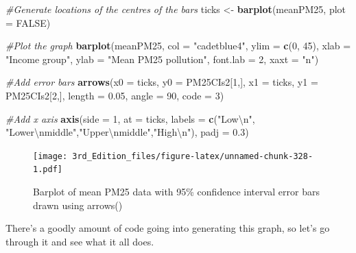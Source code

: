 \documentclass[
]{book}
\newenvironment{Shaded}{\begin{snugshade}}{\end{snugshade}}
\newcommand{\CharTok}[1]{\textcolor[rgb]{0.31,0.60,0.02}{#1}}
\newcommand{\CommentTok}[1]{\textcolor[rgb]{0.56,0.35,0.01}{\textit{#1}}}
\newcommand{\DataTypeTok}[1]{\textcolor[rgb]{0.13,0.29,0.53}{#1}}
\newcommand{\DecValTok}[1]{\textcolor[rgb]{0.00,0.00,0.81}{#1}}
\newcommand{\FloatTok}[1]{\textcolor[rgb]{0.00,0.00,0.81}{#1}}
\newcommand{\KeywordTok}[1]{\textcolor[rgb]{0.13,0.29,0.53}{\textbf{#1}}}
\newcommand{\NormalTok}[1]{#1}
\newcommand{\OtherTok}[1]{\textcolor[rgb]{0.56,0.35,0.01}{#1}}
\newcommand{\StringTok}[1]{\textcolor[rgb]{0.31,0.60,0.02}{#1}}
\begin{document}
\begin{Shaded}
\begin{Highlighting}[]

\CommentTok{#Generate locations of the centres of the bars}
\NormalTok{ticks <-}\StringTok{ }\KeywordTok{barplot}\NormalTok{(meanPM25, }\DataTypeTok{plot =} \OtherTok{FALSE}\NormalTok{)}

\CommentTok{#Plot the graph}
\KeywordTok{barplot}\NormalTok{(meanPM25,}
        \DataTypeTok{col =} \StringTok{"cadetblue4"}\NormalTok{,}
        \DataTypeTok{ylim =} \KeywordTok{c}\NormalTok{(}\DecValTok{0}\NormalTok{, }\DecValTok{45}\NormalTok{),}
        \DataTypeTok{xlab =} \StringTok{"Income group"}\NormalTok{,}
        \DataTypeTok{ylab =} \StringTok{"Mean PM25 pollution"}\NormalTok{,}
        \DataTypeTok{font.lab =} \DecValTok{2}\NormalTok{,}
        \DataTypeTok{xaxt =} \StringTok{"n"}\NormalTok{)}

\CommentTok{#Add error bars}
\KeywordTok{arrows}\NormalTok{(}\DataTypeTok{x0 =}\NormalTok{ ticks, }
       \DataTypeTok{y0 =}\NormalTok{ PM25CIs2[}\DecValTok{1}\NormalTok{,], }
       \DataTypeTok{x1 =}\NormalTok{ ticks, }
       \DataTypeTok{y1 =}\NormalTok{ PM25CIs2[}\DecValTok{2}\NormalTok{,],}
       \DataTypeTok{length =} \FloatTok{0.05}\NormalTok{,}
       \DataTypeTok{angle =} \DecValTok{90}\NormalTok{,}
       \DataTypeTok{code =} \DecValTok{3}\NormalTok{)}

\CommentTok{#Add x axis}
\KeywordTok{axis}\NormalTok{(}\DataTypeTok{side =} \DecValTok{1}\NormalTok{, }
     \DataTypeTok{at =}\NormalTok{ ticks, }
     \DataTypeTok{labels =} \KeywordTok{c}\NormalTok{(}\StringTok{"Low}\CharTok{\textbackslash{}n}\StringTok{"}\NormalTok{, }\StringTok{"Lower}\CharTok{\textbackslash{}n}\StringTok{middle"}\NormalTok{,}\StringTok{"Upper}\CharTok{\textbackslash{}n}\StringTok{middle"}\NormalTok{,}\StringTok{"High}\CharTok{\textbackslash{}n}\StringTok{"}\NormalTok{),}
     \DataTypeTok{padj =} \FloatTok{0.3}\NormalTok{)}
\end{Highlighting}
\end{Shaded}

\begin{figure}
\centering
\texttt{[image: 3rd\_Edition\_files/figure-latex/unnamed-chunk-328-1.pdf]}
\caption{\label{fig:unnamed-chunk-328}Barplot of mean PM25 data with 95\% confidence interval error bars drawn using arrows()}
\end{figure}

There's a goodly amount of code going into generating this graph, so let's go through it and see what it all does.
\end{document}
